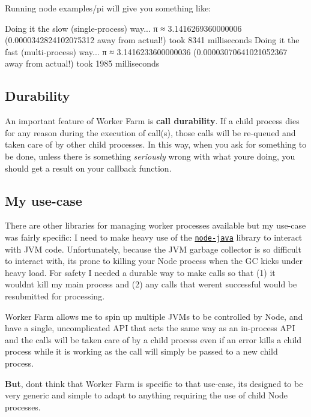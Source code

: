 Running {\ttfamily node examples/pi} will give you something like\+:


\begin{DoxyCode}
Doing it the slow (single-process) way...
π ≈ 3.1416269360000006  (0.0000342824102075312 away from actual!)
took 8341 milliseconds
Doing it the fast (multi-process) way...
π ≈ 3.1416233600000036  (0.00003070641021052367 away from actual!)
took 1985 milliseconds
\end{DoxyCode}


\subsection*{Durability}

An important feature of Worker Farm is {\bfseries call durability}. If a child process dies for any reason during the execution of call(s), those calls will be re-\/queued and taken care of by other child processes. In this way, when you ask for something to be done, unless there is something {\itshape seriously} wrong with what you\textquotesingle{}re doing, you should get a result on your callback function.

\subsection*{My use-\/case}

There are other libraries for managing worker processes available but my use-\/case was fairly specific\+: I need to make heavy use of the \href{https://github.com/nearinfinity/node-java}{\tt node-\/java} library to interact with J\+VM code. Unfortunately, because the J\+VM garbage collector is so difficult to interact with, it\textquotesingle{}s prone to killing your Node process when the GC kicks under heavy load. For safety I needed a durable way to make calls so that (1) it wouldn\textquotesingle{}t kill my main process and (2) any calls that weren\textquotesingle{}t successful would be resubmitted for processing.

Worker Farm allows me to spin up multiple J\+V\+Ms to be controlled by Node, and have a single, uncomplicated A\+PI that acts the same way as an in-\/process A\+PI and the calls will be taken care of by a child process even if an error kills a child process while it is working as the call will simply be passed to a new child process.

{\bfseries But}, don\textquotesingle{}t think that Worker Farm is specific to that use-\/case, it\textquotesingle{}s designed to be very generic and simple to adapt to anything requiring the use of child Node processes.

